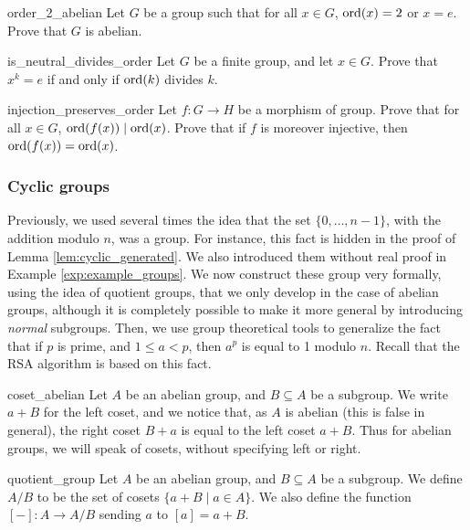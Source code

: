 \begin{cex}{}{order_2_abelian}
    Let \( G \) be a group such that for all \( x \in G \), \( \operatorname{ord}(x) = 2 \) or \( x = e \). Prove that \( G \) is abelian.    
\end{cex}

\begin{cex}{}{is_neutral_divides_order}
    Let \( G \) be a finite group, and let \( x \in G \). Prove that \( x^k = e \) if and only if \( \operatorname{ord}(k) \) divides \( k \).
\end{cex}

\begin{cex}{}{injection_preserves_order}
    Let \( f : G \to H \) be a morphism of group. Prove that for all \( x \in G \), \( \operatorname{ord}(f(x)) \mid \operatorname{ord}(x) \). Prove that if \( f \) is moreover injective, then \(  \operatorname{ord}(f(x)) = \operatorname{ord}(x) \).
\end{cex}

\subsubsection{Cyclic groups}

Previously, we used several times the idea that the set \( \{ 0, \dots, n - 1 \} \), with the addition modulo \( n \), was a group. For instance, this fact is hidden in the proof of Lemma \ref{lem:cyclic_generated}. We also introduced them without real proof in Example \ref{exp:example_groups}. We now construct these group very formally, using the idea of quotient groups, that we only develop in the case of abelian groups, although it is completely possible to make it more general by introducing \textit{normal} subgroups. Then, we use group theoretical tools to generalize the fact that if \( p \) is prime, and \( 1 \le a < p \), then \( a^p \) is equal to 1 modulo \( n \). Recall that the RSA algorithm is based on this fact.

\begin{crem}{}{coset_abelian}
    Let \( A \) be an abelian group, and \( B \subseteq A \) be a subgroup. We write \( a + B \) for the left coset, and we notice that, as \( A \) is abelian (this is false in general), the right coset \( B + a \) is equal to the left coset \( a + B \). Thus for abelian groups, we will speak of cosets, without specifying left or right.     
\end{crem}

\begin{cdef}{}{quotient_group}
    Let \( A \) be an abelian group, and \( B \subseteq A \) be a subgroup. We define \( A / B \) to be the set of cosets \( \{ a + B \mid a \in A \} \). We also define the function \( [-] : A \to A / B \) sending \( a \) to \( [a] = a + B \). 
\end{cdef}

